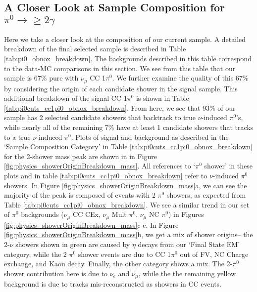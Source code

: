 \documentclass{article}
\begin{document}
\subsection{A Closer Look at Sample Composition for $\pi^0\rightarrow\geq 2 \gamma$}
Here we take a closer look at the composition of our current sample.  A detailed breakdown of the final selected sample is described in Table \ref{tab:pi0_obnox_breakdown}. The backgrounds described in this table correspond to the data-MC comparisons in this section. We see from this table that our sample is 67\% pure with $\nu_\mu$ CC 1$\pi^0$.  We further examine the quality of this 67\% by considering the origin of each candidate shower in the signal sample. This additional breakdown of the signal CC 1$\pi^0$ is shown in Table \ref{tab:pi0cuts_cc1pi0_obnox_breakdown}.  From here, we see that 93\% of our sample has 2 selected candidate showers that backtrack to true $\nu$-induced $\pi^0$'s, while nearly all of the remaining 7\% have at least 1 candidate showers that tracks to a true $\nu$-induced $\pi^0$.  Plots of signal and background as described in the `Sample Composition Category' in Table \ref{tab:pi0cuts_cc1pi0_obnox_breakdown} for the 2-shower mass peak are shown in in Figure \ref{fig:physics_showerOriginBreakdown_mass}. All references to `$\pi^0$ shower' in these plots and in table \ref{tab:pi0cuts_cc1pi0_obnox_breakdown} refer to $\nu$-induced $\pi^0$ showers.  In Figure \ref{fig:physics_showerOriginBreakdown_mass}a, we can see the majority of the peak is composed of events with 2 $\pi^0$ showers, as expected from Table \ref{tab:pi0cuts_cc1pi0_obnox_breakdown}. We see a similar trend in our set of $\pi^0$ backgrounds ($\nu_\mu$ CC CEx, $\nu_\mu$ Mult $\pi^0$, $\nu_\mu$ NC $\pi^0$) in Figures \ref{fig:physics_showerOriginBreakdown_mass}c-e.  In Figure \ref{fig:physics_showerOriginBreakdown_mass}b, we get a mix of shower origins-- the 2-$\nu$ showers shown in green are caused by $\eta$ decays from our `Final State EM' category, while the 2 $\pi^0$ shower events are due to CC 1$\pi^0$ out of FV, NC Charge exchange, and Kaon decay. Finally, the other category shows a mix.  The 2-$\pi^0$ shower contribution here is due to $\nu_e$ and $\overline{\nu_\mu}$, while the the remaining yellow background is due to tracks mis-reconstructed as showers in CC events.
\end{document}
